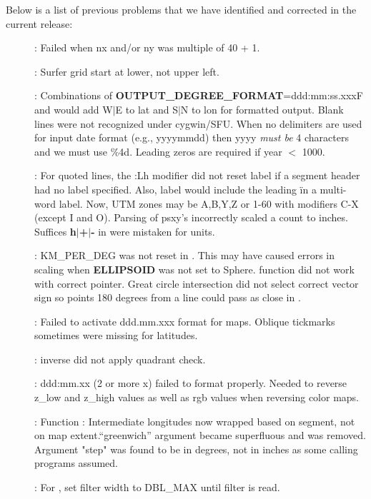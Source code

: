 Below is a list of previous problems that we have identified and corrected in the current release:
\begin{description}
\item []: Failed when nx and/or ny was multiple of 40 + 1.
\item []: Surfer grid start at lower, not upper left.
\item []: Combinations of {\bf OUTPUT\_DEGREE\_FORMAT}=ddd:mm:ss.xxxF and \Opt{:}
would add W$|$E to lat and S$|$N to lon for formatted output.
Blank lines were not recognized under cygwin/SFU.
When no delimiters are used for input date format (e.g., yyyymmdd) then yyyy \emph{must be} 4 characters
and we must use \%4d.  Leading zeros are required if year $<$ 1000.
\item []: For quoted lines, the :Lh modifier did not reset label if
a segment header had no label specified.  Also, label would include the leading \" in a multi-word label.
Now, UTM zones may be A,B,Y,Z or 1-60 with modifiers C-X (except I and O).
Parsing of psxy's  incorrectly scaled a count to inches.
Suffices {\bf h$|$+$|$-} in  were mistaken for units.
\item []: KM\_PER\_DEG was not reset in . This may have caused
errors in scaling when {\bf ELLIPSOID} was not set to Sphere.   function did not work with correct pointer.
Great circle intersection did not select correct vector sign so
points 180 degrees from a line could pass as close in .
\item []: Failed to activate ddd.mm.xxx format for maps.  Oblique tickmarks sometimes
were missing for latitudes.
\item []:  inverse did not apply quadrant check.
\item []: ddd:mm.xx (2 or more x) failed to format properly.  Needed to reverse z\_low
and z\_high values as well as rgb values when reversing color maps.
\item []: Function : Intermediate longitudes now wrapped based on segment,
not on map extent.``greenwich'' argument became superfluous and was
removed. Argument "step" was found to be in degrees, not in inches as some calling programs assumed.
\item []: For , set filter width to DBL\_MAX until filter is read.

\end{description}
